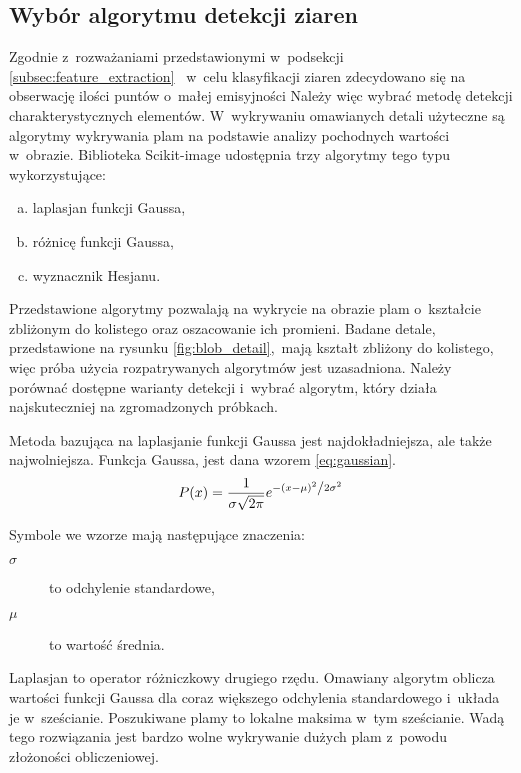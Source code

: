 \subsection{Wybór algorytmu detekcji ziaren}
\label{subsec:blob_detect}
Zgodnie z~rozważaniami przedstawionymi w~podsekcji
\ref{subsec:feature_extraction}~%
w~celu klasyfikacji ziaren zdecydowano się na obserwację ilości puntów o~małej
emisyjności
Należy więc wybrać metodę detekcji charakterystycznych elementów.
W~wykrywaniu omawianych detali użyteczne są algorytmy wykrywania plam na
podstawie analizy pochodnych wartości w~obrazie.
Biblioteka Scikit-image udostępnia trzy algorytmy tego typu wykorzystujące:
\begin{enumerate}[a)]
    \item laplasjan funkcji Gaussa,
    \item różnicę funkcji Gaussa,
    \item wyznacznik Hesjanu.
\end{enumerate}
Przedstawione algorytmy pozwalają na wykrycie na obrazie plam o~kształcie
zbliżonym do kolistego oraz oszacowanie ich promieni.
Badane detale, przedstawione na rysunku \ref{fig:blob_detail},~mają kształt
zbliżony do kolistego, więc próba użycia rozpatrywanych algorytmów jest
uzasadniona.
Należy porównać dostępne warianty detekcji i~wybrać algorytm, który działa
najskuteczniej na zgromadzonych próbkach.

Metoda bazująca na laplasjanie funkcji Gaussa jest najdokładniejsza, ale także
najwolniejsza.
Funkcja Gaussa, jest dana wzorem \ref{eq:gaussian}.
\begin{equation}
    P(x) = \frac{1}{{\sigma \sqrt {2\pi } }}
    e^{{{ - \left( {x - \mu } \right)^2 }
    \mathord{\left/ {\vphantom {{ - \left( {x - \mu } \right)^2 }
            {2\sigma ^2 }}} \right. \kern-\nulldelimiterspace} {2\sigma ^2 }}}
    \label{eq:gaussian}
\end{equation}
\begin{samepage}%
Symbole we wzorze mają następujące znaczenia:
\begin{description}
    \item[$ \sigma $] to odchylenie standardowe,
    \item[$ \mu $] to wartość średnia.
\end{description}
\end{samepage}
Laplasjan to operator różniczkowy drugiego rzędu.
Omawiany algorytm oblicza wartości funkcji Gaussa dla coraz większego odchylenia
standardowego i~układa je w~sześcianie.
Poszukiwane plamy to lokalne maksima w~tym sześcianie.
Wadą tego rozwiązania jest bardzo wolne wykrywanie dużych plam z~powodu
złożoności obliczeniowej.

